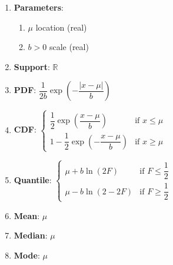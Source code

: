 \begin{enumerate}
    \item \textbf{Parameters}:
    \hfill \cite{wiki/Laplace_distribution}
    \begin{enumerate}
        \item ${\displaystyle \mu }$ location (real)
        \hfill \cite{wiki/Laplace_distribution}

        \item ${\displaystyle b>0}$ scale (real)
        \hfill \cite{wiki/Laplace_distribution}
    \end{enumerate}

    \item \textbf{Support}: $ {\displaystyle \mathbb {R} }$
    \hfill \cite{wiki/Laplace_distribution, statistics/book/Statistics-for-Data-Scientists/Maurits-Kaptein}

    \item \textbf{PDF}:
    $ {\displaystyle {\dfrac {1}{2b}}\exp \left(-{\dfrac {|x-\mu |}{b}}\right)}$
    \hfill \cite{wiki/Laplace_distribution, statistics/book/Statistics-for-Data-Scientists/Maurits-Kaptein}

    \item \textbf{CDF}: $ {\displaystyle {\begin{cases}{\dfrac {1}{2}}\exp \left({\dfrac {x-\mu }{b}}\right)&{\text{if }}x\leq \mu \\[8pt]1-{\dfrac {1}{2}}\exp \left(-{\dfrac {x-\mu }{b}}\right)&{\text{if }}x\geq \mu \end{cases}}}$
    \hfill \cite{wiki/Laplace_distribution}

    \item \textbf{Quantile}: $ {\displaystyle {\begin{cases}\mu +b\ln \left(2F\right)&{\text{if }}F\leq {\dfrac {1}{2}}\\[8pt]\mu -b\ln \left(2-2F\right)&{\text{if }}F\geq {\dfrac {1}{2}}\end{cases}}}$
    \hfill \cite{wiki/Laplace_distribution}

    \item \textbf{Mean}: $ {\displaystyle \mu }$
    \hfill \cite{wiki/Laplace_distribution}

    \item \textbf{Median}: $ {\displaystyle \mu }$
    \hfill \cite{wiki/Laplace_distribution}

    \item \textbf{Mode}: $ {\displaystyle \mu }$
    \hfill \cite{wiki/Laplace_distribution}


\end{enumerate}

